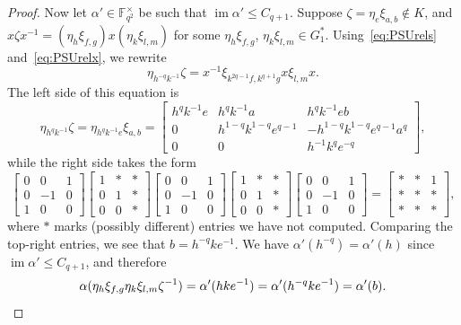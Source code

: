 \documentclass[11pt]{article}
\theoremstyle{definition}
\numberwithin{equation}{section}
\begin{document}
\begin{proof}
Now let $\alpha' \in \mathbb{F}_{q^2}^\times$ be such that $\operatorname{im} \alpha' \leq C_{q+1}$.
Suppose $\zeta = \eta_e \xi_{a,b} \notin K$, and $x\zeta x^{-1} = (\eta_{h} \xi_{f,g} ) x (\eta_{k} \xi_{l,m})$ for some $\eta_h \xi_{f,g}$, $\eta_k \xi_{l,m} \in G_1^*$.
Using~\eqref{eq:PSUrels} and~\eqref{eq:PSUrelx}, we rewrite
\[
\eta_{h^{-q} k^{-1}} \zeta
=
x^{-1} \xi_{k^{2q-1} f, k^{q+1} g} x \xi_{l,m} x.
\]
The left side of this equation is
\[ \eta_{h^q k^{-1}} \zeta 
=
\eta_{h^q k^{-1} e} \xi_{a,b}
=
\begin{bmatrix}
h^q k^{-1} e & h^q k^{-1} a & h^q k^{-1} e b \\
0 & h^{1-q} k^{1-q} e^{q-1} & -h^{1-q} k^{1-q} e^{q-1} a^q \\
0 & 0 & h^{-1} k^q e^{-q}
\end{bmatrix},
\]
while the right side takes the form
\[
\begin{bmatrix} 0 & 0 & 1 \\ 0 & -1 & 0 \\ 1 & 0 & 0 \end{bmatrix}
\begin{bmatrix} 1 & \ast & \ast \\ 0 & 1 & \ast \\ 0 & 0 & \ast \end{bmatrix}
\begin{bmatrix} 0 & 0 & 1 \\ 0 & -1 & 0 \\ 1 & 0 & 0 \end{bmatrix}
\begin{bmatrix} 1 & \ast & \ast \\ 0 & 1 & \ast \\ 0 & 0 & \ast \end{bmatrix}
\begin{bmatrix} 0 & 0 & 1 \\ 0 & -1 & 0 \\ 1 & 0 & 0 \end{bmatrix}
=
\begin{bmatrix} \ast & \ast & 1 \\ \ast & \ast & \ast \\ \ast & \ast & \ast \end{bmatrix},
\]
where $\ast$ marks (possibly different) entries we have not computed.
Comparing the top-right entries, we see that
$b = h^{-q} k e^{-1}$.
We have $\alpha'(h^{-q}) = \alpha'(h)$ since $\operatorname{im} \alpha' \leq C_{q+1}$, and therefore
\[ \alpha( \eta_h \xi_{f,g} \eta_k \xi_{l,m} \zeta^{-1} ) = \alpha'(hke^{-1}) = \alpha'(h^{-q} k e^{-1}) = \alpha'(b). \qedhere \]
\end{proof}
\end{document}

